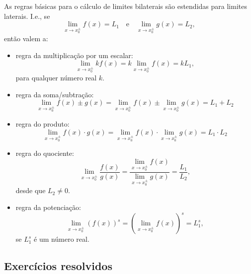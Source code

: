 \begin{obs}
  As regras básicas para o cálculo de limites bilaterais são estendidas para limites laterais. I.e., se
  \begin{equation}
    \lim_{x\to x_0^{\pm}} f(x) = L_1\quad\text{e}\quad\lim_{x\to x_0^{\pm}} g(x) = L_2,
  \end{equation}
  então valem a:
  \begin{itemize}
\item regra da multiplicação por um escalar:
  \begin{equation}
    \lim_{x\to x_0^{\pm}} kf(x) = k\lim_{x\to x_0^{\pm}} f(x) = kL_1,
  \end{equation}
  para qualquer número real $k$.
\item regra da soma/subtração:
  \begin{equation}
    \lim_{x\to x_0^{\pm}} f(x) \pm g(x) = \lim_{x\to x_0^{\pm}} f(x) \pm \lim_{x\to x_0^{\pm}} g(x) = L_1 + L_2
  \end{equation}
\item regra do produto:
  \begin{equation}
    \lim_{x\to x_0^\pm} f(x) \cdot g(x) = \lim_{x\to x_0^\pm} f(x) \cdot \lim_{x\to x_0^\pm} g(x) = L_1 \cdot L_2
  \end{equation}
\item regra do quociente:
  \begin{equation}
    \lim_{x\to x_0^\pm} \frac{f(x)}{g(x)} = \frac{\lim_{x\to x_0^\pm} f(x)}{\lim_{x\to x_0^\pm} g(x)} = \frac{L_1}{L_2},
  \end{equation}
  desde que $L_2\neq 0$.
\item regra da potenciação:
  \begin{equation}
    \lim_{x\to x_0^\pm} (f(x))^s = \left(\lim_{x\to x_0^\pm} f(x) \right)^s = L_1^s,
  \end{equation}
  se $L_1^s$ é um número real.
\end{itemize}
\end{obs}

\subsection*{Exercícios resolvidos}

